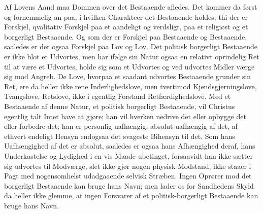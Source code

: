 \documentclass[12pt]{book}
\begin{document}
Af Lovens Aand maa Dommen over det Bestaaende afledes. Det kommer da
først og fornemmelig an paa, i hvilken Charakteer det Bestaaende
holdes; thi der er Forskjel, qvalitativ Forskjel paa et aandeligt og
verdsligt, paa et religiøst og et borgerligt Bestaaende. Og som der
er Forskjel paa Bestaaende og Bestaaende, saaledes er der ogsaa
Forskjel paa Lov og Lov. Det politisk borgerligt Bestaaende er ikke
blot et Udvortes, men har ifølge sin Natur ogsaa en relativt
oprindelig Ret til at være et Udvortes, holde sig som et Udvortes og
ved udvortes Midler værge sig mod Angreb. De Love, hvorpaa et
saadant udvortes Bestaaende grunder sin Ret, ere da heller ikke rene
Inderlighedslove, men tvertimod Kjendsgjerningslove, Tvangslove,
Retslove, ikke i egentlig Forstand Retfærdighedslove. Med et
Bestaaende af denne Natur, et politisk borgerligt Bestaaende, vil
Christus egentlig talt Intet have at gjøre; han vil hverken nedrive
det eller opbygge det eller forbedre det; han er personlig
uafhængig, absolut uafhængig af det, af ethvert endeligt Hensyn
endogsaa det svageste Bihensyn til det. Som hans Uafhængighed af det
er absolut, saaledes er ogsaa hans Afhængighed deraf, hans
Underkastelse og Lydighed i en vis Maade ubetinget, forsaavidt han
ikke sætter sig udvortes til Modværge, slet ikke gjør nogen physisk
Modstand, ikke staaer i Pagt med nogensomhelst udadgaaende selvisk
Stræben. Ingen Oprører mod det borgerligt Bestaaende kan bruge hans
Navn; men lader os for Sandhedens Skyld da heller ikke glemme, at
ingen Forsvarer af et politisk-borgerligt Bestaaende kan bruge hans
Navn.
\end{document}
